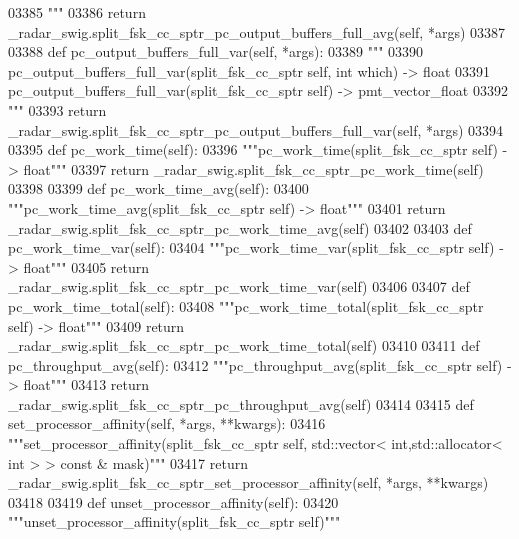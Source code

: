 \begin{DoxyCode}
{{{{{{{{{{{{03385 \textcolor{stringliteral}{        """}
03386         \textcolor{keywordflow}{return} \_radar\_swig.split\_fsk\_cc\_sptr\_pc\_output\_buffers\_full\_avg(self, *args)
03387 
03388     \textcolor{keyword}{def }pc_output_buffers_full_var(self, *args):
03389         \textcolor{stringliteral}{"""}
03390 \textcolor{stringliteral}{        pc\_output\_buffers\_full\_var(split\_fsk\_cc\_sptr self, int which) -> float}
03391 \textcolor{stringliteral}{        pc\_output\_buffers\_full\_var(split\_fsk\_cc\_sptr self) -> pmt\_vector\_float}
03392 \textcolor{stringliteral}{        """}
03393         \textcolor{keywordflow}{return} \_radar\_swig.split\_fsk\_cc\_sptr\_pc\_output\_buffers\_full\_var(self, *args)
03394 
03395     \textcolor{keyword}{def }pc_work_time(self):
03396         \textcolor{stringliteral}{"""pc\_work\_time(split\_fsk\_cc\_sptr self) -> float"""}
03397         \textcolor{keywordflow}{return} \_radar\_swig.split\_fsk\_cc\_sptr\_pc\_work\_time(self)
03398 
03399     \textcolor{keyword}{def }pc_work_time_avg(self):
03400         \textcolor{stringliteral}{"""pc\_work\_time\_avg(split\_fsk\_cc\_sptr self) -> float"""}
03401         \textcolor{keywordflow}{return} \_radar\_swig.split\_fsk\_cc\_sptr\_pc\_work\_time\_avg(self)
03402 
03403     \textcolor{keyword}{def }pc_work_time_var(self):
03404         \textcolor{stringliteral}{"""pc\_work\_time\_var(split\_fsk\_cc\_sptr self) -> float"""}
03405         \textcolor{keywordflow}{return} \_radar\_swig.split\_fsk\_cc\_sptr\_pc\_work\_time\_var(self)
03406 
03407     \textcolor{keyword}{def }pc_work_time_total(self):
03408         \textcolor{stringliteral}{"""pc\_work\_time\_total(split\_fsk\_cc\_sptr self) -> float"""}
03409         \textcolor{keywordflow}{return} \_radar\_swig.split\_fsk\_cc\_sptr\_pc\_work\_time\_total(self)
03410 
03411     \textcolor{keyword}{def }pc_throughput_avg(self):
03412         \textcolor{stringliteral}{"""pc\_throughput\_avg(split\_fsk\_cc\_sptr self) -> float"""}
03413         \textcolor{keywordflow}{return} \_radar\_swig.split\_fsk\_cc\_sptr\_pc\_throughput\_avg(self)
03414 
03415     \textcolor{keyword}{def }set_processor_affinity(self, *args, **kwargs):
03416         \textcolor{stringliteral}{"""set\_processor\_affinity(split\_fsk\_cc\_sptr self, std::vector< int,std::allocator< int > > const &
       mask)"""}
03417         \textcolor{keywordflow}{return} \_radar\_swig.split\_fsk\_cc\_sptr\_set\_processor\_affinity(self, *args, **kwargs)
03418 
03419     \textcolor{keyword}{def }unset_processor_affinity(self):
03420         \textcolor{stringliteral}{"""unset\_processor\_affinity(split\_fsk\_cc\_sptr self)"""}
}}}}}}}}}}}}
\end{DoxyCode}
